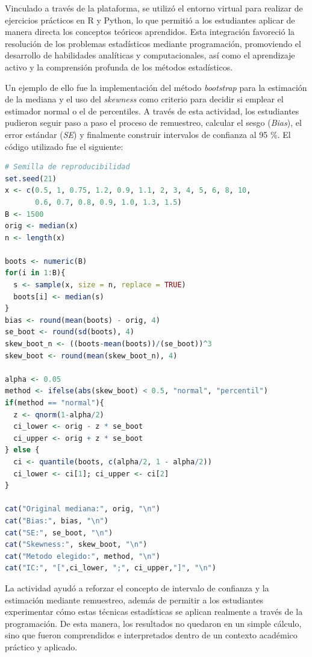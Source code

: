 \documentclass[letter,oneside,12pt,spanish]{report}
\begin{document}
\newpage

Vinculado a través de la plataforma, se utilizó el entorno virtual para realizar de ejercicios prácticos en R y Python, lo que permitió a los estudiantes aplicar de manera directa los conceptos teóricos aprendidos. Esta integración favoreció la resolución de los problemas estadísticos mediante programación, promoviendo el desarrollo de habilidades analíticas y computacionales, así como el aprendizaje activo y la comprensión profunda de los métodos estadísticos.

Un ejemplo de ello fue la implementación del método \textit{bootstrap} para la estimación de la mediana y el uso del \textit{skewness} como criterio para decidir si emplear el estimador normal o el de percentiles. A través de esta actividad, los estudiantes pudieron seguir paso a paso el proceso de remuestreo, calcular el sesgo (\textit{Bias}), el error estándar (\textit{SE}) y finalmente construir intervalos de confianza al 95 \%. El código utilizado fue el siguiente:

\begin{lstlisting}[language=R, caption={Implementación del método bootstrap y Skewness para la mediana en R}]
# Semilla de reproducibilidad
set.seed(21)
x <- c(0.5, 1, 0.75, 1.2, 0.9, 1.1, 2, 3, 4, 5, 6, 8, 10, 
       0.6, 0.7, 0.8, 0.9, 1.0, 1.3, 1.5)
B <- 1500
orig <- median(x)
n <- length(x)

boots <- numeric(B)
for(i in 1:B){
  s <- sample(x, size = n, replace = TRUE)
  boots[i] <- median(s)
}
bias <- round(mean(boots) - orig, 4)
se_boot <- round(sd(boots), 4)
skew_boot_n <- ((boots-mean(boots))/(se_boot))^3
skew_boot <- round(mean(skew_boot_n), 4)

alpha <- 0.05
method <- ifelse(abs(skew_boot) < 0.5, "normal", "percentil")
if(method == "normal"){
  z <- qnorm(1-alpha/2)
  ci_lower <- orig - z * se_boot
  ci_upper <- orig + z * se_boot
} else {
  ci <- quantile(boots, c(alpha/2, 1 - alpha/2))
  ci_lower <- ci[1]; ci_upper <- ci[2]
}

cat("Original mediana:", orig, "\n")
cat("Bias:", bias, "\n")
cat("SE:", se_boot, "\n")
cat("Skewness:", skew_boot, "\n")
cat("Metodo elegido:", method, "\n")
cat("IC:", "[",ci_lower, ";", ci_upper,"]", "\n")
\end{lstlisting}

La actividad ayudó a reforzar el concepto de intervalo de confianza y la estimación mediante remuestreo, además de permitir a los estudiantes experimentar cómo estas técnicas estadísticas se aplican realmente a través de la programación. De esta manera, los resultados no quedaron en un simple cálculo, sino que fueron comprendidos e interpretados dentro de un contexto académico práctico y aplicado.
\end{document}
